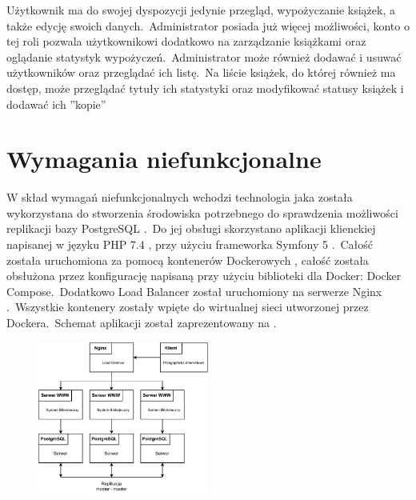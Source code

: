 Użytkownik ma do swojej dyspozycji jedynie przegląd, wypożyczanie książek, a także edycję swoich danych.\ Administrator posiada już więcej możliwości, konto o tej roli pozwala użytkownikowi dodatkowo na zarządzanie książkami oraz oglądanie statystyk wypożyczeń.\ Administrator może również dodawać i usuwać użytkowników oraz przeglądać ich listę.\ Na liście książek, do której również ma dostęp, może przeglądać tytuły ich statystyki oraz modyfikować statusy książek i dodawać ich ''kopie''

\section{Wymagania niefunkcjonalne}
W skład wymagań niefunkcjonalnych wchodzi technologia jaka została wykorzystana do stworzenia środowiska potrzebnego do sprawdzenia możliwości replikacji bazy PostgreSQL \cite{Pos2023}.\ Do jej obsługi skorzystano aplikacji klienckiej napisanej w języku PHP 7.4 \cite{Php2023}, przy użyciu frameworka Symfony 5 \cite{Sym2023}.\ Całość została uruchomiona za pomocą kontenerów Dockerowych \cite{Doc2023}, całość została obsłużona przez konfigurację napisaną przy użyciu biblioteki dla Docker: Docker Compose.\ Dodatkowo Load Balancer został uruchomiony na serwerze Nginx \cite{Nginx2023}.\ Wszystkie kontenery zostały wpięte do wirtualnej sieci utworzonej przez Dockera.\ Schemat aplikacji został zaprezentowany na .

\begin{figure}[H]
    \centering
    \includegraphics[width=0.5\textwidth]{images/roisb}
    \label{fig:roisb}
\end{figure}
